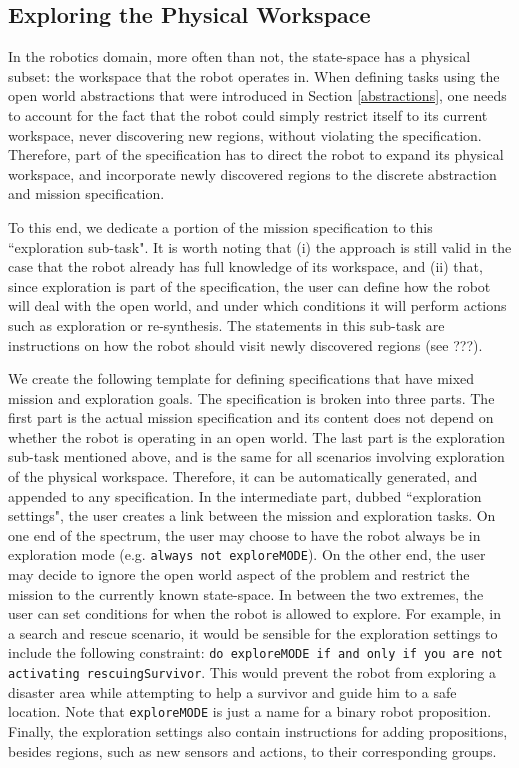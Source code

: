 \subsection{Exploring the Physical Workspace}

In the robotics domain, more often than not, the state-space has a physical subset: the workspace that the robot operates in. When defining tasks using the open world abstractions that were introduced in Section \ref{abstractions}, one needs to account for the fact that the robot could simply restrict itself to its current workspace, never discovering new regions, without violating the specification. Therefore, part of the specification has to direct the robot to expand its physical workspace, and incorporate newly discovered regions to the discrete abstraction and mission specification.

To this end, we dedicate a portion of the mission specification to this ``exploration sub-task". It is worth noting that (i) the approach is still valid in the case that the robot already has full knowledge of its workspace, and (ii) that, since exploration is part of the specification, the user can define how the robot will deal with the open world, and under which conditions it will perform actions such as exploration or re-synthesis. The statements in this sub-task are instructions on how the robot should visit newly discovered regions (see ???).

We create the following template for defining specifications that have mixed mission and exploration goals. The specification is broken into three parts. The first part is the actual mission specification and its content does not depend on whether the robot is operating in an open world. The last part is the exploration sub-task mentioned above, and is the same for all scenarios involving exploration of the physical workspace. Therefore, it can be automatically generated, and appended to any specification. In the intermediate part, dubbed ``exploration settings", the user creates a link between the mission and exploration tasks. On one end of the spectrum, the user may choose to have the robot always be in exploration mode (e.g. \texttt{always not exploreMODE}). On the other end, the user may decide to ignore the open world aspect of the problem and restrict the mission to the currently known state-space. In between the two extremes, the user can set conditions for when the robot is allowed to explore. For example, in a search and rescue scenario, it would be sensible for the exploration settings to include the following constraint: \texttt{do exploreMODE if and only if you are not activating rescuingSurvivor}. This would prevent the robot from exploring a disaster area while attempting to help a survivor and guide him to a safe location. Note that \texttt{exploreMODE} is just a name for a binary robot proposition. Finally, the exploration settings also contain instructions for adding propositions, besides regions, such as new sensors and actions, to their corresponding groups.

